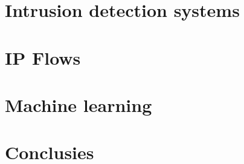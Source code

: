 \begin{samenvatting}
\addchaptertocentry{\nederlandsesamenvatting}


\section{Intrusion detection systems}

\section{IP Flows}

\section{Machine learning}

\section{Conclusies}

\end{samenvatting}